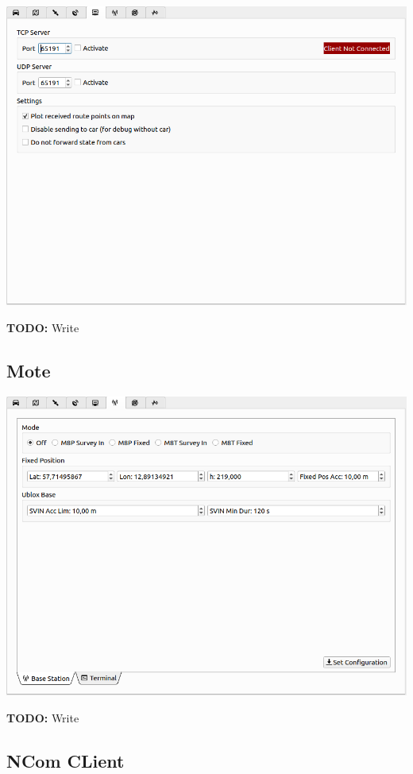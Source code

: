 \documentclass[12pt]{article} %
\newcommand{\todo}[1]{{\color{red} \textbf{TODO:} #1}}
\begin{document}
\noindent \includegraphics[width=\textwidth]{./screens/network_interface.png}

\todo{Write}

\subsection{Mote}

\noindent \includegraphics[width=\textwidth]{./screens/mote.png}

\todo{Write}

\subsection{NCom CLient}
\end{document}
